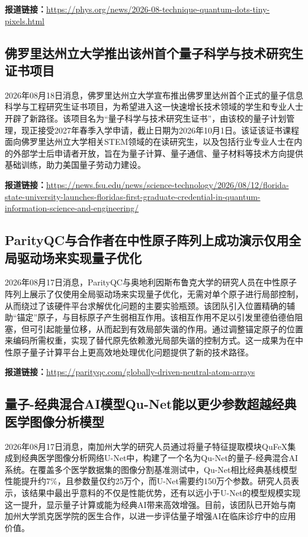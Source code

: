 \documentclass[12pt,a4paper]{ctexart}
\begin{document}
\noindent\textbf{报道链接：}\url{https://phys.org/news/2026-08-technique-quantum-dots-tiny-pixels.html}

\subsection{ 佛罗里达州立大学推出该州首个量子科学与技术研究生证书项目 }

2026年08月18日消息，佛罗里达州立大学宣布推出佛罗里达州首个正式的量子信息科学与工程研究生证书项目，为希望进入这一快速增长技术领域的学生和专业人士开辟了新路径。该项目名为“量子科学与技术研究生证书”，由该校的量子计划管理，现正接受2027年春季入学申请，截止日期为2026年10月1日。该证该证书课程面向佛罗里达州立大学相关STEM领域的在读研究生，以及包括行业专业人士在内的外部学士后申请者开放，旨在为量子计算、量子通信、量子材料等技术方向提供基础训练，助力美国量子劳动力建设。

\noindent\textbf{报道链接：}\url{https://news.fsu.edu/news/science-technology/2026/08/12/florida-state-university-launches-floridas-first-graduate-credential-in-quantum-information-science-and-engineering/}

\subsection{ ParityQC与合作者在中性原子阵列上成功演示仅用全局驱动场来实现量子优化 }

2026年08月17日消息，ParityQC与奥地利因斯布鲁克大学的研究人员在中性原子阵列上展示了仅使用全局驱动场来实现量子优化，无需对单个原子进行局部控制，从而绕过了该硬件平台求解优化问题的主要实验瓶颈。该团队引入位置精确的辅助“锚定”原子，与目标原子产生弱相互作用。该相互作用不足以引发里德伯德伯阻塞，但可引起能量位移，从而起到有效局部失谐的作用。通过调整锚定原子的位置来编码所需权重，实现了替代原先依赖激光局部失谐的控制方式。这一成果为在中性原子量子计算平台上更高效地处理优化问题提供了新的技术路径。

\noindent\textbf{报道链接：}\url{https://parityqc.com/globally-driven-neutral-atom-arrays}

\subsection{ 量子-经典混合AI模型Qu-Net能以更少参数超越经典医学图像分析模型 }

2026年08月17日消息，南加州大学的研究人员通过将量子特征提取模块QuFeX集成到经典医学图像分析网络U-Net中，构建了一个名为Qu-Net的量子-经典混合AI系统。在覆盖多个医学数据集的图像分割基准测试中，Qu-Net相比经典基线模型性能提升约7\%，且参数量仅约25万个，而U-Net需要约150万个参数。研究人员表示，该结果中最出乎意料的不仅是性能优势，还有以远小于U-Net的模型规模实现这一提升，显示量子计算或能为经典AI带来高效增强。目前，该团队已开始与南加州大学凯克医学院的医生合作，以进一步评估量子增强AI在临床诊疗中的应用价值。
\end{document}
